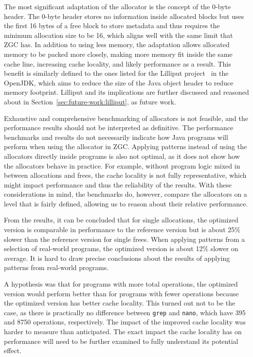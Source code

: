 
The most significant adaptation of the allocator is the concept of the 0-byte header. The 0-byte header stores no information inside allocated blocks but uses the first 16 bytes of a free block to store metadata and thus requires the minimum allocation size to be 16, which aligns well with the same limit that ZGC has. In addition to using less memory, the adaptation allows allocated memory to be packed more closely, making more memory fit inside the same cache line, increasing cache locality, and likely performance as a result. This benefit is similarly defined to the ones listed for the Lilliput project~\cite{lilliput} in the OpenJDK, which aims to reduce the size of the Java object header to reduce memory footprint. Lilliput and its implications are further discussed and reasoned about in Section~\ref{sec:future-work:lilliput}, as future work.

Exhaustive and comprehensive benchmarking of allocators is not feasible, and the performance results should not be interpreted as definitive. The performance benchmarks and results do not necessarily indicate how Java programs will perform when using the allocator in ZGC. Applying patterns instead of using the allocators directly inside programs is also not optimal, as it does not show how the allocators behave in practice. For example, without program logic mixed in between allocations and frees, the cache locality is not fully representative, which might impact performance and thus the reliability of the results. With these considerations in mind, the benchmarks do, however, compare the allocators on a level that is fairly defined, allowing us to reason about their relative performance. 

From the results, it can be concluded that for single allocations, the optimized version is comparable in performance to the reference version but is about 25\% slower than the reference version for single frees. When applying patterns from a selection of real-world programs, the optimized version is about 12\% slower on average. It is hard to draw precise conclusions about the results of applying patterns from real-world programs. 

A hypothesis was that for programs with more total operations, the optimized version would perform better than for programs with fewer operations because the optimized version has better cache locality. This turned out not to be the case, as there is practically no difference between \texttt{grep} and \texttt{nano}, which have 395 and 8750 operations, respectively. The impact of the improved cache locality was harder to measure than anticipated. The exact impact the cache locality has on performance will need to be further examined to fully understand its potential effect.

